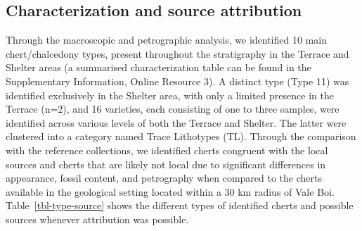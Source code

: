 \documentclass[
  a4paper,
  DIV=11,
  numbers=noendperiod]{scrreprt}
\begin{document}
\subsection{Characterization and source
attribution}\label{characterization-and-source-attribution}

Through the macroscopic and petrographic analysis, we identified 10 main
chert/chalcedony types, present throughout the stratigraphy in the
Terrace and Shelter areas (a summarised characterization table can be
found in the Supplementary Information, Online Resource 3). A distinct
type (Type 11) was identified exclusively in the Shelter area, with only
a limited presence in the Terrace (n=2), and 16 varieties, each
consisting of one to three samples, were identified across various
levels of both the Terrace and Shelter. The latter were clustered into a
category named Trace Lithotypes (TL). Through the comparison with the
reference collections, we identified cherts congruent with the local
sources and cherts that are likely not local due to significant
differences in appearance, fossil content, and petrography when compared
to the cherts available in the geological setting located within a 30 km
radius of Vale Boi. Table~\ref{tbl-type-source} shows the different
types of identified cherts and possible sources whenever attribution was
possible.
\end{document}
